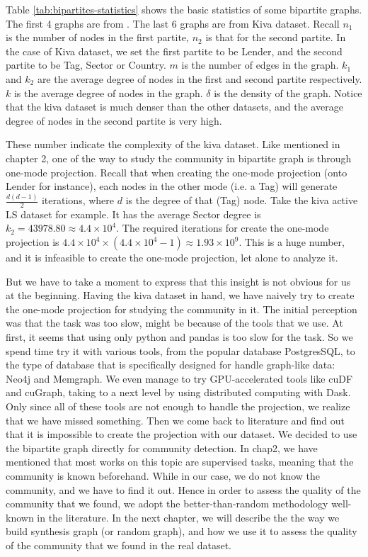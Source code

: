 Table \ref{tab:bipartites-statistics} shows the basic statistics of some bipartite graphs.
The first 4 graphs are from \parencite{latapy2006}.
The last 6 graphs are from Kiva dataset.
Recall $n_1$ is the number of nodes in the first partite, $n_2$ is that for the second partite.
In the case of Kiva dataset, we set the first partite to be Lender, and the second partite to be Tag, Sector or Country.
$m$ is the number of edges in the graph.
$k_1$ and $k_2$ are the average degree of nodes in the first and second partite respectively.
$k$ is the average degree of nodes in the graph.
$\delta$ is the density of the graph.
Notice that the kiva dataset is much denser than the other datasets,
and the average degree of nodes in the second partite is very high.

These number indicate the complexity of the kiva dataset.
Like mentioned in chapter 2, one of the way to study the community in bipartite graph is through one-mode projection.
Recall that when creating the one-mode projection (onto Lender for instance),
each nodes in the other mode (i.e. a Tag) will generate $\frac{d(d-1)}{2}$ iterations,
where $d$ is the degree of that (Tag) node.
Take the kiva active LS dataset for example.
It has the average Sector degree is $k_2=43978.80 \approx 4.4\times 10^4$.
The required iterations for create the one-mode projection is
$4.4\times 10^4 \times (4.4\times 10^4 - 1) \approx 1.93 \times 10^9$.
This is a huge number, and it is infeasible to create the one-mode projection, let alone to analyze it.

But we have to take a moment to express that this insight is not obvious for us at the beginning.
Having the kiva dataset in hand, we have naively try to create the one-mode projection for studying the community in it.
The initial perception was that the task was too slow, might be because of the tools that we use.
At first, it seems that using only python and pandas is too slow for the task.
So we spend time try it with various tools, from the popular database PostgresSQL,
to the type of database that is specifically designed for handle graph-like data: Neo4j and Memgraph.
We even manage to try GPU-accelerated tools like cuDF and cuGraph,
taking to a next level by using distributed computing with Dask.
Only since all of these tools are not enough to handle the projection,
we realize that we have missed something.
Then we come back to literature and find out that it is impossible to create the projection with our dataset.
We decided to use the bipartite graph directly for community detection.
In chap2, we have mentioned that most works on this topic are supervised tasks,
meaning that the community is known beforehand.
While in our case, we do not know the community, and we have to find it out.
Hence in order to assess the quality of the community that we found,
we adopt the better-than-random methodology well-known in the literature.
In the next chapter, we will describe the the way we build synthesis graph (or random graph),
and how we use it to assess the quality of the community that we found in the real dataset.

